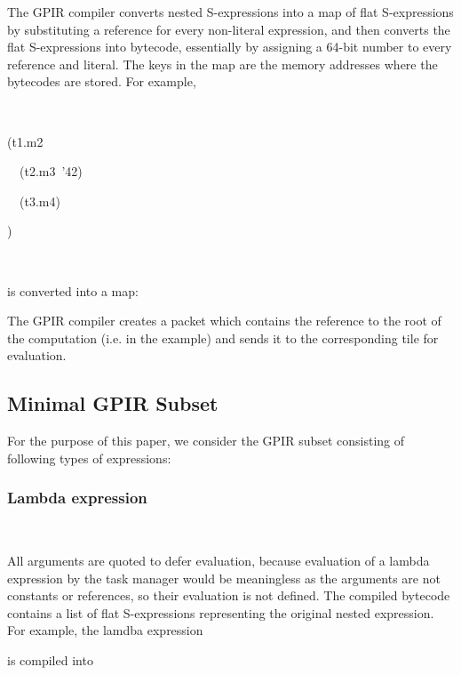 \documentclass[copyright,creativecommons]{eptcs}
\newenvironment{lyxcode}
{\par\begin{list}{}{
\setlength{\rightmargin}{\leftmargin}
\setlength{\listparindent}{0pt}\raggedright
\setlength{\itemsep}{0pt}
\setlength{\parsep}{0pt}
\normalfont\ttfamily}\item[]}
{\end{list}}
\begin{document}
The GPIR compiler converts nested S-expressions into a map of flat
S-expressions by substituting a reference for every non-literal expression,
and then converts the flat S-expressions into bytecode, essentially
by assigning a 64-bit number to every reference and literal. The keys
in the map are the memory addresses where the bytecodes are stored.
For example,
\begin{lyxcode}
{\small{}~}{\small \par}

{\small (t1.m2~}{\small \par}

{\small{}~~(t2.m3~'42)~}{\small \par}

{\small{}~~(t3.m4)}{\small \par}

{\small )}{\small \par}

{\small{}~}{\small \par}
\end{lyxcode}
is converted into a map:



The GPIR compiler creates a packet which contains the reference to
the root of the computation (i.e.  in the example) and sends
it to the corresponding tile for evaluation. 


\subsection{Minimal GPIR Subset}

For the purpose of this paper, we consider the GPIR subset consisting
of following types of expressions:


\subsubsection{Lambda expression}

~




All arguments are quoted to defer evaluation, because evaluation of
a lambda expression by the task manager would be meaningless as the
arguments  are not constants or references, so their evaluation
is not defined. The compiled bytecode contains a list of flat S-expressions
representing the original nested expression. For example, the lamdba
expression 




is compiled into
\end{document}
